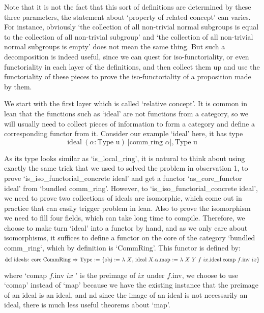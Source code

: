\documentclass[11pt]{article}
\begin{document}
Note that it is not the fact that this sort of definitions are determined by these three parameters, the statement about `property of related concept' can varies. For instance, obviously `the collection of all non-trivial normal subgroups is equal to the collection of all non-trivial subgroup' and `the collection of all non-trivial normal subgroups is empty' does not mean the same thing. But such a decomposition is indeed useful, since we can quest for iso-functoriality, or even functoriality in each layer of the definitions, and then collect them up and use the functoriality of these pieces to prove the iso-functoriality of a proposition made by them.

We start with the first layer which is called `relative concept'. It is common in lean that the functions such as `ideal' are not functions from a category, so we will usually need to collect pieces of information to form a category and define a corresponding functor from it. Consider our example `ideal' here, it has type \[\text{ideal} \ (\alpha : \text{Type u}) \  \text{[comm\_ring $\alpha$]}, \text{Type u}\]

As its type looks similar as `is\_local\_ring', it is natural to think about using exactly the same trick that we used to solved the problem in observation 1, to prove `is\_iso\_functorial\_concrete ideal' and get a functor `as\_core\_functor ideal' from `bundled comm\_ring'. However, to `is\_iso\_functorial\_concrete ideal', we need to prove two collections of ideals are isomorphic, which come out in practice that can easily trigger problem in lean. Also to prove the isomorphism we need to fill four fields, which can take long time to compile. Therefore, we choose to make turn `ideal' into a functor by hand, and as we only care about isomorphisms, it suffices to define a functor on the core of the category `bundled comm\_ring`, which by definition is `CommRing'. This functor is defined by:
\[\text{def ideals: core CommRing $\Rightarrow$ Type := 
  \{obj := $\lambda \ X$, ideal $X.\alpha$,\\
    map := $\lambda \ X \ Y \ f \ ix$,ideal.comp $f$.inv $ix$\}}\]

where `comap $f$.inv $ix$ ' is the preimage of $ix$ under $f$.inv, we choose to use `comap' instead of `map' because we have the existing instance that the preimage of an ideal is an ideal, and nd since the image of an ideal is not necessarily an ideal, there is much less useful theorems about `map'.
\end{document}

